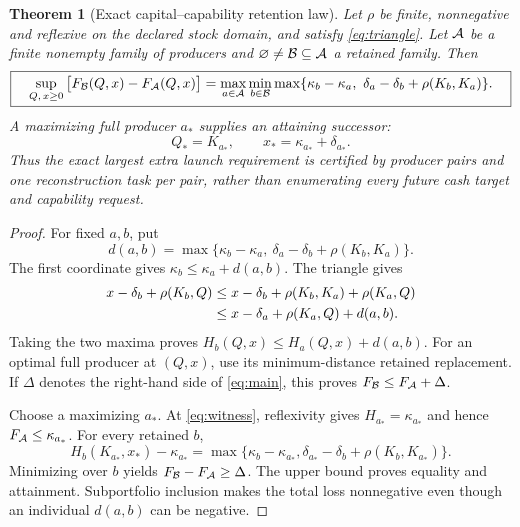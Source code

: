\documentclass[11pt,letterpaper]{article}
\newtheorem{theorem}{Theorem}[section]
\theoremstyle{definition}\newtheorem{definition}[theorem]{Definition}
\theoremstyle{remark}\newtheorem{remark}[theorem]{Remark}
\begin{document}
\begin{theorem}[Exact capital--capability retention law]
\label{thm:main}
Let $\rho$ be finite, nonnegative and reflexive on the declared stock domain, and satisfy \eqref{eq:triangle}. Let $\mathcal A$ be a finite nonempty family of producers and $\varnothing\ne\mathcal B\subseteq\mathcal A$ a retained family. Then
\begin{equation}
 \boxed{\quad
 \sup_{Q,\,x\ge0}\big[F_\mathcal B(Q,x)-F_\mathcal A(Q,x)\big]
 =\max_{a\in\mathcal A}\min_{b\in\mathcal B}
 \max\{\kappa_b-\kappa_a,\ \delta_a-\delta_b+\rho(K_b,K_a)\}.
 \quad}
 \label{eq:main}
\end{equation}
A maximizing full producer $a_*$ supplies an attaining successor:
\begin{equation}
 Q_*=K_{a_*},\qquad x_*=\kappa_{a_*}+\delta_{a_*}.
 \label{eq:witness}
\end{equation}
Thus the exact largest extra launch requirement is certified by producer pairs and one reconstruction task per pair, rather than enumerating every future cash target and capability request.
\end{theorem}
\begin{proof}
For fixed $a,b$, put
\begin{equation}
 d(a,b)=\max\{\kappa_b-\kappa_a,\ \delta_a-\delta_b+\rho(K_b,K_a)\}.
 \label{eq:distance}
\end{equation}
The first coordinate gives $\kappa_b\le\kappa_a+d(a,b)$. The triangle gives
\begin{align}
 x-\delta_b+\rho(K_b,Q)
 &\le x-\delta_b+\rho(K_b,K_a)+\rho(K_a,Q)\notag\\
 &\le x-\delta_a+\rho(K_a,Q)+d(a,b).
 \label{eq:upper}
\end{align}
Taking the two maxima proves $H_b(Q,x)\le H_a(Q,x)+d(a,b)$. For an optimal full producer at $(Q,x)$, use its minimum-distance retained replacement. If $\Delta$ denotes the right-hand side of \eqref{eq:main}, this proves $F_\mathcal B\le F_\mathcal A+\Delta$.

Choose a maximizing $a_*$. At \eqref{eq:witness}, reflexivity gives $H_{a_*}=\kappa_{a_*}$ and hence $F_\mathcal A\le\kappa_{a_*}$. For every retained $b$,
\begin{equation}
 H_b(K_{a_*},x_*)-\kappa_{a_*}
 =\max\{\kappa_b-\kappa_{a_*},\delta_{a_*}-\delta_b+\rho(K_b,K_{a_*})\}.
\end{equation}
Minimizing over $b$ yields $F_\mathcal B-F_\mathcal A\ge\Delta$. The upper bound proves equality and attainment. Subportfolio inclusion makes the total loss nonnegative even though an individual $d(a,b)$ can be negative.
\end{proof}
\end{document}
